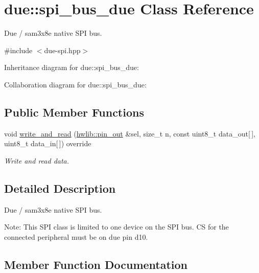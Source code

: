 \hypertarget{classdue_1_1spi__bus__due}{}\section{due\+:\+:spi\+\_\+bus\+\_\+due Class Reference}
\label{classdue_1_1spi__bus__due}


Due / sam3x8e native S\+PI bus.  




{\ttfamily \#include $<$due-\/spi.\+hpp$>$}



Inheritance diagram for due\+:\+:spi\+\_\+bus\+\_\+due\+:


Collaboration diagram for due\+:\+:spi\+\_\+bus\+\_\+due\+:
\subsection*{Public Member Functions}
\begin{DoxyCompactItemize}
\item 
void \hyperlink{classdue_1_1spi__bus__due_ab153084cb35b044537058d15c57a4cb8}{write\+\_\+and\+\_\+read} (\hyperlink{classhwlib_1_1pin__out}{hwlib\+::pin\+\_\+out} \&sel, size\+\_\+t n, const uint8\+\_\+t data\+\_\+out\mbox{[}$\,$\mbox{]}, uint8\+\_\+t data\+\_\+in\mbox{[}$\,$\mbox{]}) override
\begin{DoxyCompactList}\small\item\em Write and read data. \end{DoxyCompactList}\end{DoxyCompactItemize}


\subsection{Detailed Description}
Due / sam3x8e native S\+PI bus. 

Note\+: This S\+PI class is limited to one device on the S\+PI bus. CS for the connected peripheral must be on due pin d10. 

\subsection{Member Function Documentation}
\mbox{\label{classdue_1_1spi__bus__due_ab153084cb35b044537058d15c57a4cb8}} 
